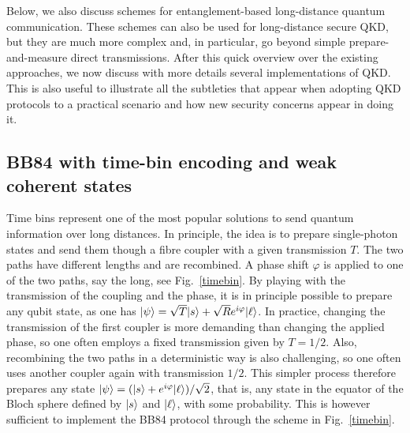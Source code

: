 \documentclass[a4paper]{article}
\begin{document}
Below, we also discuss schemes for entanglement-based long-distance quantum communication. These schemes can also be used for long-distance secure QKD, but they are much more complex and, in particular, go beyond simple prepare-and-measure direct transmissions. After this quick overview over the existing approaches, we now discuss with more details several implementations of QKD. This is also useful to illustrate all the subtleties that appear when adopting QKD protocols to a practical scenario and how new security concerns appear in doing it.

\subsection{BB84 with time-bin encoding and weak coherent states}

Time bins represent one of the most popular solutions to send quantum information over long distances. In principle, the idea is to prepare single-photon states and send them though a fibre coupler with a given transmission $T$.  The two paths have different lengths and are recombined. A phase shift $\varphi$ is applied to one of the two paths, say the long, see Fig.~\ref{timebin}. By playing with the transmission of the coupling and the phase, it is in principle possible to prepare any qubit state, as one has $|\psi\rangle=\sqrt T|s\rangle+\sqrt Re^{i\varphi}|\ell\rangle$. In practice, changing the transmission of the first coupler is more demanding than changing the applied phase, so one often employs a fixed transmission given by $T=1/2$. Also, recombining the two paths in a deterministic way is also challenging, so one often uses another coupler again with transmission $1/2$. This simpler process therefore prepares any state $|\psi\rangle=(|s\rangle+e^{i\varphi}|\ell\rangle)/\sqrt 2$, that is, any state in the equator of the Bloch sphere defined by $|s\rangle$ and $|\ell\rangle$, with some probability. This is however sufficient to implement the BB84 protocol through the scheme in Fig.~\ref{timebin}.
\end{document}
